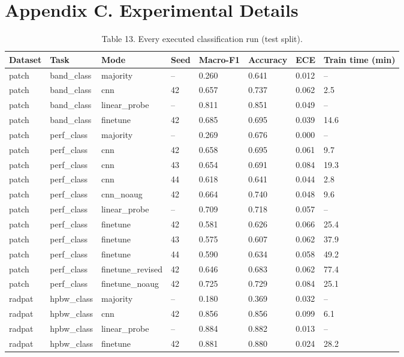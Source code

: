 \documentclass[11pt,a4paper]{article}
\begin{document}
\section*{Appendix C. Experimental Details}
\begin{table}[H]\centering\small
\caption*{Table 13. Every executed classification run (test split).}
\begin{tabularx}{\linewidth}{XXXXXXXX}
\toprule
\textbf{Dataset} & \textbf{Task} & \textbf{Mode} & \textbf{Seed} & \textbf{Macro-F1} & \textbf{Accuracy} & \textbf{ECE} & \textbf{Train time (min)} \\
\midrule
patch & band\_class & majority & -- & 0.260 & 0.641 & 0.012 & -- \\
patch & band\_class & cnn & 42 & 0.657 & 0.737 & 0.062 & 2.5 \\
patch & band\_class & linear\_probe & -- & 0.811 & 0.851 & 0.049 & -- \\
patch & band\_class & finetune & 42 & 0.685 & 0.695 & 0.039 & 14.6 \\
patch & perf\_class & majority & -- & 0.269 & 0.676 & 0.000 & -- \\
patch & perf\_class & cnn & 42 & 0.658 & 0.695 & 0.061 & 9.7 \\
patch & perf\_class & cnn & 43 & 0.654 & 0.691 & 0.084 & 19.3 \\
patch & perf\_class & cnn & 44 & 0.618 & 0.641 & 0.044 & 2.8 \\
patch & perf\_class & cnn\_noaug & 42 & 0.664 & 0.740 & 0.048 & 9.6 \\
patch & perf\_class & linear\_probe & -- & 0.709 & 0.718 & 0.057 & -- \\
patch & perf\_class & finetune & 42 & 0.581 & 0.626 & 0.066 & 25.4 \\
patch & perf\_class & finetune & 43 & 0.575 & 0.607 & 0.062 & 37.9 \\
patch & perf\_class & finetune & 44 & 0.590 & 0.634 & 0.058 & 49.2 \\
patch & perf\_class & finetune\_revised & 42 & 0.646 & 0.683 & 0.062 & 77.4 \\
patch & perf\_class & finetune\_noaug & 42 & 0.725 & 0.729 & 0.084 & 25.1 \\
radpat & hpbw\_class & majority & -- & 0.180 & 0.369 & 0.032 & -- \\
radpat & hpbw\_class & cnn & 42 & 0.856 & 0.856 & 0.099 & 6.1 \\
radpat & hpbw\_class & linear\_probe & -- & 0.884 & 0.882 & 0.013 & -- \\
radpat & hpbw\_class & finetune & 42 & 0.881 & 0.880 & 0.024 & 28.2 \\
\bottomrule
\end{tabularx}
\end{table}
\end{document}
